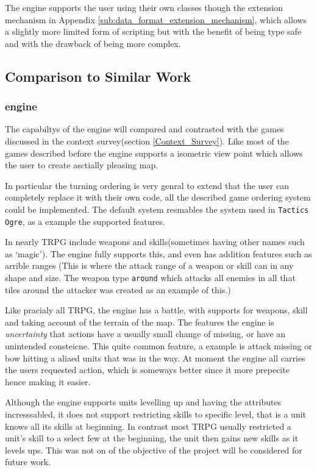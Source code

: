 The engine supports the user using their own classes though the extension mechanism in Appendix \ref{sub:data_format_extension_mechanism}, which allows a slightly more limited form of scripting but with the benefit of being type safe and with the drawback of being more complex.

% 

\subsection{Comparison to Similar Work}
\subsubsection{engine}
\label{ssub:engine}

The capabiltys of the engine will compared and contrasted with the games discussed in the context survey(section \ref{Context_Survey}).  Like most of the games described before the engine supports a isometric view point which allows the user to create asctially pleasing map.  
	
In particular the turning ordering is very genral to extend that the user can completely replace it with their own code, all the described game ordering system could be implemented.  The default system resmables the system used in \texttt{Tactics Ogre}, as a example the supported features. 

In nearly TRPG  include weapons and  skills(sometimes having other names such as `magic'). The engine fully supports this, and even has addition features such as arrible ranges (This is where the attack range of a weapon or skill can in any shape and size. The weapon type \texttt{around} which attacks all enemies in all that tiles around the attacker was created as an example of this.)

Like pracialy all TRPG, the engine has a battle, with supports for weapons, skill and taking account of the terrain of the map.  The features the engine is \emph{uncertainty} that actions have a usually small change of missing, or have an unintended consteicne. This quite common feature, a example is attack missing or bow hitting a aliaed units that was in the way. At moment the engine all carries the users requested action, which is someways better since it more prepecite hence making it easier.  

Although the engine supports units levelling up and having the attributes incresssabled, it does not support restricting  skills to specific level, that is a unit knows all its skills at beginning. In contrast most TRPG usually restricted a unit's skill to a select few at the beginning, the unit then gains new skills as it levels ups. This was not on of the objective of the project will be considered for future work.

